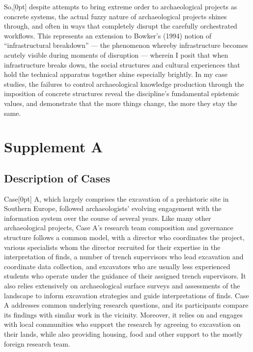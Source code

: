 \documentclass[
]{article}
\newcommand{\paragraphnumber}[1]{\marginnote{\color{lightgray}\tiny{#1}}[0pt]}
\begin{document}
So,\paragraphnumber{[84]} despite attempts to bring extreme order to
archaeological projects as concrete systems, the actual fuzzy nature of
archaeological projects shines through, and often in ways that
completely disrupt the carefully orchestrated workflows. This represents
an extension to Bowker's (1994) notion of ``infrastructural breakdown''
--- the phenomenon whereby infrastructure becomes acutely visible during
moments of disruption --- wherein I posit that when infrastructure
breaks down, the social structures and cultural experiences that hold
the technical apparatus together shine especially brightly. In my case
studies, the failures to control archaeological knowledge production
through the imposition of concrete structures reveal the discipline's
fundamental epistemic values, and demonstrate that the more things
change, the more they stay the same.

\section{Supplement A}\label{supplement-a}

\subsection{Description of Cases}\label{description-of-cases}

Case\paragraphnumber{[85]} A, which largely comprises the excavation of
a prehistoric site in Southern Europe, followed archaeologists' evolving
engagement with the information system over the course of several years.
Like many other archaeological projects, Case A's research team
composition and governance structure follows a common model, with a
director who coordinates the project, various specialists whom the
director recruited for their expertise in the interpretation of finds, a
number of trench supervisors who lead excavation and coordinate data
collection, and excavators who are usually less experienced students who
operate under the guidance of their assigned trench supervisors. It also
relies extensively on archaeological surface surveys and assessments of
the landscape to inform excavation strategies and guide interpretations
of finds. Case A addresses common underlying research questions, and its
participants compare its findings with similar work in the vicinity.
Moreover, it relies on and engages with local communities who support
the research by agreeing to excavation on their lands, while also
providing housing, food and other support to the mostly foreign research
team.
\end{document}
